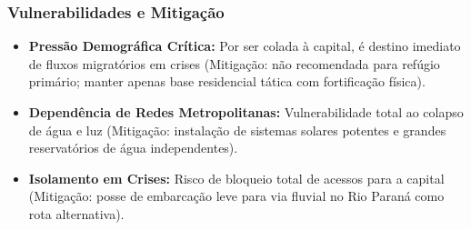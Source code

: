 \subsubsection{Vulnerabilidades e
Mitigação}

\begin{itemize}
\tightlist
\item
  \textbf{Pressão Demográfica Crítica:} Por ser colada à capital, é
  destino imediato de fluxos migratórios em crises (Mitigação: não
  recomendada para refúgio primário; manter apenas base residencial
  tática com fortificação física).
\item
  \textbf{Dependência de Redes Metropolitanas:} Vulnerabilidade total ao
  colapso de água e luz (Mitigação: instalação de sistemas solares
  potentes e grandes reservatórios de água independentes).
\item
  \textbf{Isolamento em Crises:} Risco de bloqueio total de acessos para
  a capital (Mitigação: posse de embarcação leve para via fluvial no Rio
  Paraná como rota alternativa).
\end{itemize}

